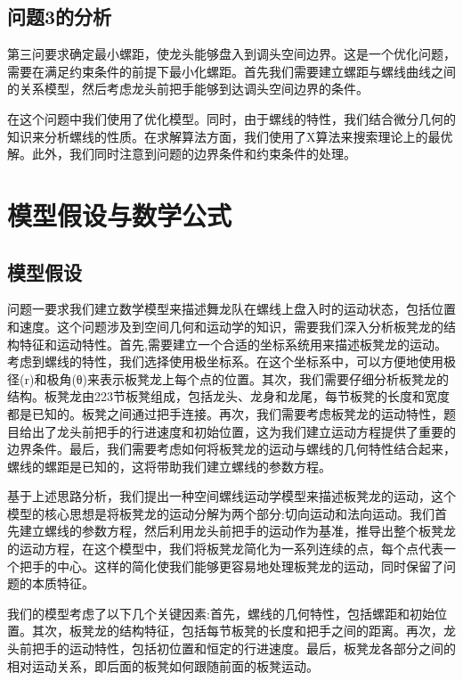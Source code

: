 \documentclass[withoutpreface,bwprint]{cumcmthesis1} %
\begin{document}
\subsection{问题3的分析}
第三问要求确定最小螺距，使龙头能够盘入到调头空间边界。这是一个优化问题，需要在满足约束条件的前提下最小化螺距。首先我们需要建立螺距与螺线曲线之间的关系模型，然后考虑龙头前把手能够到达调头空间边界的条件。\par
在这个问题中我们使用了优化模型。同时，由于螺线的特性，我们结合微分几何的知识来分析螺线的性质。在求解算法方面，我们使用了X算法来搜索理论上的最优解。此外，我们同时注意到问题的边界条件和约束条件的处理。
\section{模型假设与数学公式}
\subsection{模型假设}
问题一要求我们建立数学模型来描述舞龙队在螺线上盘入时的运动状态，包括位置和速度。这个问题涉及到空间几何和运动学的知识，需要我们深入分析板凳龙的结构特征和运动特性。首先,需要建立一个合适的坐标系统用来描述板凳龙的运动。考虑到螺线的特性，我们选择使用极坐标系。在这个坐标系中，可以方便地使用极径(r)和极角(θ)来表示板凳龙上每个点的位置。其次，我们需要仔细分析板凳龙的结构。板凳龙由223节板凳组成，包括龙头、龙身和龙尾，每节板凳的长度和宽度都是已知的。板凳之间通过把手连接。再次，我们需要考虑板凳龙的运动特性，题目给出了龙头前把手的行进速度和初始位置，这为我们建立运动方程提供了重要的边界条件。最后，我们需要考虑如何将板凳龙的运动与螺线的几何特性结合起来，螺线的螺距是已知的，这将带助我们建立螺线的参数方程。\par
基于上述思路分析，我们提出一种空间螺线运动学模型来描述板凳龙的运动，这个模型的核心思想是将板凳龙的运动分解为两个部分:切向运动和法向运动。我们首先建立螺线的参数方程，然后利用龙头前把手的运动作为基准，推导出整个板凳龙的运动方程，在这个模型中，我们将板凳龙简化为一系列连续的点，每个点代表一个把手的中心。这样的简化使我们能够更容易地处理板凳龙的运动，同时保留了问题的本质特征。\par
我们的模型考虑了以下几个关键因素:首先，螺线的几何特性，包括螺距和初始位置。其次，板凳龙的结构特征，包括每节板凳的长度和把手之间的距离。再次，龙头前把手的运动特性，包括初位置和恒定的行进速度。最后，板凳龙各部分之间的相对运动关系，即后面的板凳如何跟随前面的板凳运动。
\end{document}
